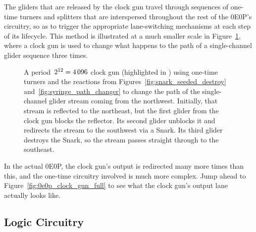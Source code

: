 The gliders that are released by the clock gun travel through sequences of one-time turners and splitters that are interspersed throughout the rest of the 0E0P's circuitry, so as to trigger the appropriate lane-switching mechanisms at each step of its lifecycle. This method is illustrated at a much smaller scale in Figure~\ref{fig:clock_path_switcher}, where a clock gun is used to change what happens to the path of a single-channel glider sequence three times.

\begin{figure}[!htb]
	\centering
	\caption{A period~$2^{12} = 4{\,}096$ clock gun (highlighted in ) using one-time turners and the reactions from Figures~\ref{fig:snark_seeded_destroy} and~\ref{fig:syringe_path_changer} to change the path of the single-channel glider stream coming from the northwest. Initially, that stream is reflected to the northeast, but the first glider from the clock gun blocks the reflector. Its second glider unblocks it and redirects the stream to the southwest via a Snark. Its third glider destroys the Snark, so the stream passes straight through to the southeast.}\label{fig:clock_path_switcher}
\end{figure}

In the actual 0E0P, the clock gun's output is redirected many more times than this, and the one-time circuitry involved is much more complex. Jump ahead to Figure~\ref{fig:0e0p_clock_gun_full} to see what the clock gun's output lane actually looks like.



\subsection{Logic Circuitry}\label{sec:0e0p_structure_logic}

